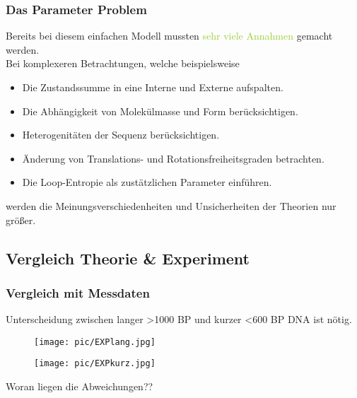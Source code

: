 \begin{frame}
\frametitle{Das Parameter Problem}
Bereits bei diesem einfachen Modell mussten \textcolor{YellowGreen}{sehr viele Annahmen} gemacht werden. \\
\vspace{0.2cm}
Bei komplexeren Betrachtungen, welche beispielsweise
\begin{itemize}
\item Die Zustandssumme in eine Interne und Externe aufspalten.
\item Die Abhängigkeit von Molekülmasse und Form berücksichtigen. 
\item Heterogenitäten der Sequenz berücksichtigen. 
\item Änderung von Translations- und Rotationsfreiheitsgraden betrachten.
\item Die Loop-Entropie als zustätzlichen Parameter einführen.
\end{itemize}
\vspace{0.2cm}
werden die Meinungsverschiedenheiten und Unsicherheiten der Theorien nur größer.
\end{frame}

\subsection{Vergleich Theorie \& Experiment}
\begin{frame}
\frametitle{Vergleich mit Messdaten}
\small Unterscheidung zwischen langer >1000 BP  und kurzer <600 BP DNA ist nötig.\\
\begin{minipage}{5.2cm}
\begin{figure}[h]
	\centering
		\texttt{[image: pic/EXPlang.jpg]}
\end{figure}
\centering
\tiny\cite{WAR85}
\end{minipage}
\hfill
\begin{minipage}{5.2cm}
\begin{figure}[h]
	\centering
		\texttt{[image: pic/EXPkurz.jpg]}
\end{figure}
\centering
\tiny\cite{WAR85}
\end{minipage}
\centering
Woran liegen die Abweichungen??
\end{frame}

